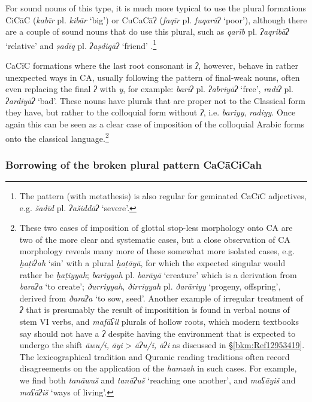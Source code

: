 \documentclass[output=paper]{langsci/langscibook}
\begin{document}
For sound nouns of this type, it is much more typical to use the plural formations CiCāC (\textit{kabīr} pl. \textit{kibār} ‘big’) or CuCaCāʔ (\textit{faqīr} pl. \textit{fuqarāʔ} ‘poor’), although there are a couple of sound nouns that do use this plural, such as \textit{qarīb} pl. \textit{ʔaqribāʔ} ‘relative’ and \textit{ṣadīq} pl. \textit{ʔaṣdiqāʔ} ‘friend’ \citep[106--107]{Ratcliffe1998}.\footnote{The pattern (with metathesis) is also regular for geminated CaCīC adjectives, e.g. \textit{šadīd}  pl. \textit{ʔašiddāʔ} ‘severe’.}

CaCīC formations where the last root consonant is \textit{ʔ}, however, behave in rather unexpected ways in CA, usually following the pattern of final-weak nouns, often even replacing the final \textit{ʔ} with \textit{y}, for example: \textit{barīʔ} pl. \textit{ʔabriyāʔ} ‘free’, \textit{radīʔ} pl. \textit{ʔardiyāʔ} ‘bad’. These nouns have plurals that are proper not to the Classical form they have, but rather to the colloquial form without \textit{ʔ}, i.e. \textit{bariyy}, \textit{radiyy}. Once again this can be seen as a clear case of imposition of the colloquial Arabic forms onto the classical language.\footnote{These two cases of imposition of glottal stop-less morphology onto CA are two of the more clear and systematic cases, but a close observation of CA morphology reveals many more of these somewhat more isolated cases, e.g. \textit{ḫaṭīʔah} ‘sin’ with a plural \textit{ḫaṭāyā}, for which the expected singular would rather be \textit{ḫaṭiyyah}; \textit{bariyyah} pl. \textit{barāyā} ‘creature’ which is a derivation from \textit{baraʔa} ‘to create’; \textit{ðurriyyah}, \textit{ðirriyyah} pl. \textit{ðarāriyy} ‘progeny, offspring’, derived from \textit{ðaraʔa} ‘to sow, seed’. Another example of irregular treatment of \textit{ʔ} that is presumably the result of impositition is found in verbal nouns of stem VI verbs, and \textit{mafāʕil} plurals of hollow roots, which modern textbooks say should not have a \textit{ʔ} despite having the environment that is expected to undergo the shift \textit{āwu/i,} \textit{āyi} > \textit{āʔu/i,} \textit{āʔi} as discussed in §\ref{bkm:Ref12953419}. The lexicographical tradition and Quranic reading traditions often record disagreements on the application of the \textit{hamzah} in such cases. For example, we find both \textit{tanāwuš} and \textit{tanāʔuš} ‘reaching one another’, and \textit{maʕāyiš} and \textit{maʕāʔiš} ‘ways of living’.}

\subsubsection{\label{bkm:Ref13224664}Borrowing of the broken plural pattern CaCāCiCah}
\end{document}
